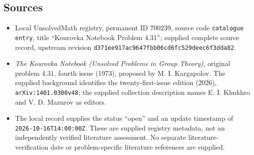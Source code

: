 \documentclass[11pt]{article}
\begin{document}
\subsection{Sources}
\begin{itemize}
\item Local UnsolvedMath registry, permanent ID \(700239\), source code \texttt{catalogue entry}, title ``Kourovka Notebook Problem 4.31''; supplied complete source record, upstream revision \texttt{d371ee917ac9647fbb06cd6fc529deec6f3dda82}.
\item \emph{The Kourovka Notebook (Unsolved Problems in Group Theory)}, original problem \(4.31\), fourth issue (1973), proposed by M. I. Kargapolov. The supplied background identifies the twenty-first-issue edition (2026), \texttt{arXiv:1401.0300v48}; the supplied collection description names E. I. Khukhro and V. D. Mazurov as editors.
\item The local record supplies the status ``open'' and an update timestamp of \texttt{2026-10-16T14:00:00Z}. These are supplied registry metadata, not an independently verified literature assessment. No separate literature-verification date or problem-specific literature references are supplied.
\end{itemize}
\end{document}
